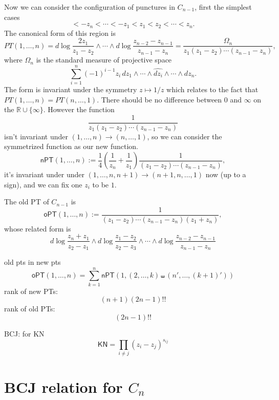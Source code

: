 \documentclass[12pt]{article}
\theoremstyle{definition}
\theoremstyle{plain}
\begin{document}
Now we can consider the configuration of punctures in $C_{n-1}$, first the simplest cases
\[
	<-z_n<\cdots<-z_1<z_1<z_2<\cdots<z_{n}.
\]
The canonical form of this region is
\[
	PT(1,\dots,n)=d\log \frac{2z_1}{z_1-z_2}\wedge\cdots\wedge d\log \frac{z_{n-2}-z_{n-1}}{z_{n-1}-z_n}
	=\frac{\Omega_n}{z_1(z_1-z_2)\cdots (z_{n-1}-z_{n})},
\]
where $\Omega_n$ is the standard measure of projective space
\[
	\sum_{i=1}^{n} (-1)^{i-1}z_i\,dz_1\wedge \cdots\wedge \widehat{dz_i}\wedge \cdots\wedge dz_{n}.
\]
The form is invariant under the symmetry $z\mapsto 1/z$ which relates to the fact that 
$PT(1,\dots,n)=PT(n,\dots,1)$. There should be no difference between $0$ and $\infty$ on the $\mathbb R\cup \{\infty\}$. However the function
\[
	\frac{1}{z_1(z_1-z_2)\cdots (z_{n-1}-z_{n})}
\]
isn't invariant under $(1,\dots,n)\to (n,\dots,1)$, so we can consider the symmetrized function as our new function.
\[
    \boxed{
		\mathsf{nPT}(1,\dots,n):=\frac{1}{4}\left(\frac{1}{z_n}+\frac{1}{z_1}\right)\frac{1}{\left(z_1-z_2\right) \cdots \left(z_{n-1}-z_n\right)},
	}
\]
it's invariant under  under $(1,\dots,n,n+1)\to (n+1,n,\dots,1)$ now (up to a sign), and we can fix one $z_i$ to be $1$.

The old PT of $C_{n-1}$ is
\[
    \boxed{
		\mathsf{oPT}(1,\dots,n):=\frac{1}{\left(z_1-z_2\right) \cdots \left(z_{n-1}-z_n\right)\left(z_1+z_n\right)},
	}
\]
whose related form is 
\[
	d\log \frac{z_n+z_1}{z_2-z_1}\wedge d\log \frac{z_1-z_2}{z_2-z_3}\wedge\cdots\wedge d\log \frac{z_{n-2}-z_{n-1}}{z_{n-1}-z_n}
\]

old pts in new pts
\[
	\boxed{
	\mathsf{oPT}(1,\dots,n)=\sum_{k=1}^n \mathsf{nPT}(1,(2,\dots,k)\shuffle (n',\dots,(k+1)'))
	}
\]
rank of new PTs:
\[
    (n+1)(2n-1)!!
\]
rank of old PTs:
\[
    (2n-1)!!
\]

BCJ: for KN 
\[
	\mathsf{KN}=\prod_{i\neq j}(z_i-z_j)^{s_{ij}}
\]

\section{BCJ relation for $C_{n}$}
\end{document}
